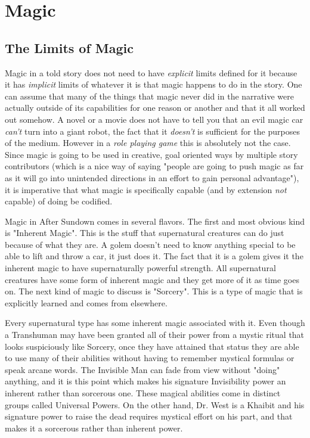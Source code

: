 \chapter{Magic}

\section{The Limits of Magic}

Magic in a told story does not need to have \textit{explicit} limits defined for it because it has \textit{implicit} limits of whatever it is that magic happens to do in the story. One can assume that many of the things that magic never did in the narrative were actually outside of its capabilities for one reason or another and that it all worked out somehow. A novel or a movie does not have to tell you that an evil magic car \textit{can't} turn into a giant robot, the fact that it \textit{doesn't} is sufficient for the purposes of the medium. However in a \textit{role playing game} this is absolutely not the case. Since magic is going to be used in creative, goal oriented ways by multiple story contributors (which is a nice way of saying "people are going to push magic as far as it will go into unintended directions in an effort to gain personal advantage"), it is imperative that what magic is specifically capable (and by extension \textit{not} capable) of doing be codified.

Magic in After Sundown comes in several flavors. The first and most obvious kind is "Inherent Magic". This is the stuff that supernatural creatures can do just because of what they are. A golem doesn't need to  know anything special to be able to lift and throw a car, it just does it. The fact that it is a golem gives it the inherent magic to have supernaturally powerful strength. All supernatural creatures have some form of inherent magic and they get more of it as time goes on. The next kind of magic to discuss is "Sorcery". This is a type of magic that is explicitly learned and comes from elsewhere. 

Every supernatural type has some inherent magic associated with it. Even though a Transhuman may have been granted all of their power from a mystic ritual that looks suspiciously like Sorcery, once they have attained that status they are able to use many of their abilities without having to remember mystical formulas or speak arcane words. The Invisible Man can fade from view without "doing" anything, and it is this point which makes his signature Invisibility power an inherent rather than sorcerous one. These magical abilities come in distinct groups called Universal Powers. On the other hand, Dr. West is a Khaibit and his signature power to raise the dead requires mystical effort on his part, and that makes it a sorcerous rather than inherent power. 

